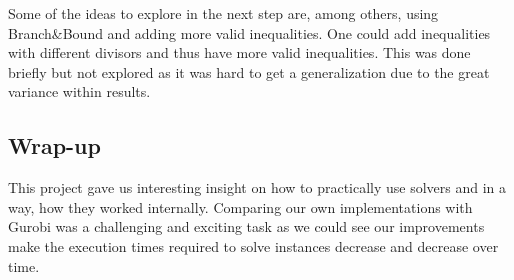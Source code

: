 \documentclass[a4paper,10pt]{article}
\begin{document}
    Some of the ideas to explore in the next step are, among others, using Branch\&Bound and adding more valid inequalities. One could add inequalities with different divisors and thus have more valid inequalities. This was done briefly but not explored as it was hard to get a generalization due to the great variance within results.
	

	\subsection{Wrap-up}
	This project gave us interesting insight on how to practically use solvers  and  in a way, how they worked internally. Comparing our own implementations with Gurobi was a challenging and exciting task as we could see our improvements make the execution times required to solve instances decrease and decrease over time.
	



\nocite{*}
\end{document}
